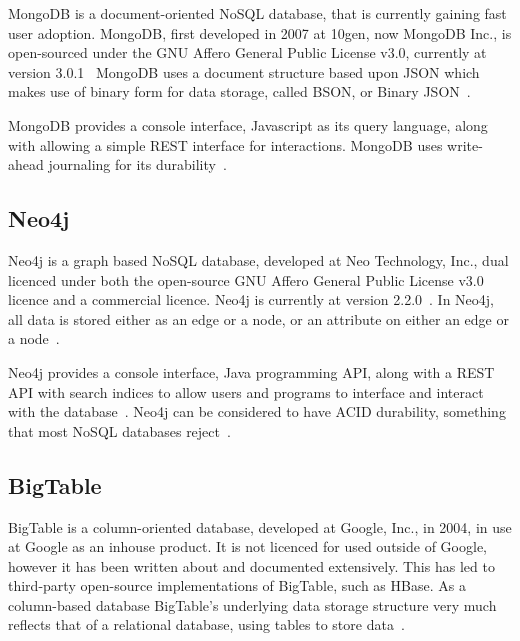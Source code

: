 \documentclass{article}
\begin{document}
MongoDB is a document-oriented NoSQL database, that is currently gaining fast user adoption. MongoDB,
first developed in 2007 at 10gen, now MongoDB Inc., is open-sourced under the GNU Affero General Public License v3.0,
currently at version 3.0.1~\cite{6_mongodb.org_2015} MongoDB uses a document structure based upon
JSON which makes use of binary form for data storage, called BSON, or Binary JSON~\cite{1_mongo_docs_2015}.

MongoDB provides a console interface, Javascript as its query language, along with allowing a simple REST
interface for interactions. MongoDB uses write-ahead journaling for its durability~\cite{redmond2012seven}.



\subsection{Neo4j} %
\label{ssub:neo4j}

Neo4j is a graph based NoSQL database, developed at Neo Technology, Inc., dual licenced under both the open-source
GNU Affero General Public License v3.0 licence and a commercial licence. Neo4j is currently at version 2.2.0~\cite{2_neo4j}.
In Neo4j, all data is stored either as an edge or a node, or an attribute on either an edge or a node~\cite{1_neo4j}.

Neo4j provides a console interface, Java programming API, along with a REST API with search indices to allow users and programs to interface and
interact with the database~\cite{redmond2012seven}. Neo4j can be considered to have ACID durability, something that
most NoSQL databases reject~\cite{redmond2012seven}.





\subsection{BigTable} %
\label{ssub:bigtable}

BigTable is a column-oriented database, developed at Google, Inc., in 2004, in use at Google as an inhouse product.
It is not licenced for used outside of Google, however it has been written about and documented extensively.
This has led to third-party open-source implementations of BigTable, such as HBase. As a column-based database
BigTable's underlying data storage structure very much reflects that of a relational database, using
tables to store data~\cite{chang2008bigtable}.
\end{document}
